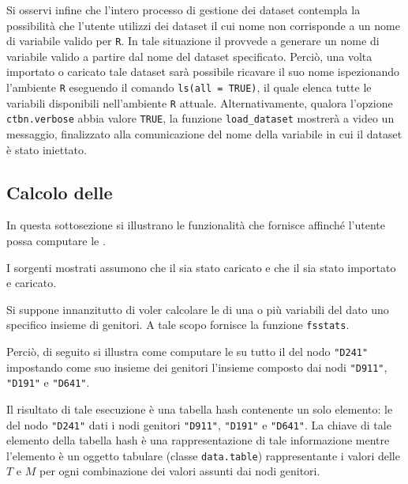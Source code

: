 Si osservi infine che l'intero processo di gestione dei dataset contempla la possibilità che l'utente utilizzi dei dataset il cui nome non corrisponde a un nome di variabile valido per \lstinline$R$. In tale situazione il \pacchettor{} provvede a generare un nome di variabile valido a partire dal nome del dataset specificato. Perciò, una volta importato o caricato tale dataset sarà possibile ricavare il suo nome ispezionando l'ambiente \lstinline$R$ eseguendo il comando \lstinline[language=rstats]{ls(all = TRUE)}, il quale elenca tutte le variabili disponibili nell'ambiente \lstinline$R$ attuale. Alternativamente, qualora l'opzione \lstinline$ctbn.verbose$ abbia valore \lstinline[language=rstats]{TRUE}, la funzione \lstinline[language=rstats]{load_dataset} mostrerà a video un messaggio, finalizzato alla comunicazione del nome della variabile in cui il dataset è stato iniettato.

\vspace*{8pt}

\subsection{Calcolo delle \stats{}}
In questa sottosezione si illustrano le funzionalità che \rctbn{} fornisce affinché l'utente possa computare le \emph{\stats{}}.

I sorgenti mostrati assumono che il \pacchettor{} sia stato caricato e che il  sia stato importato e caricato.

Si suppone innanzitutto di voler calcolare le \emph{\stats{}} di una o più variabili del  dato uno specifico insieme di genitori. A tale scopo \rctbn{} fornisce la funzione \lstinline[language=rstats]{fsstats}.

Perciò, di seguito si illustra come computare le \emph{\stats{}} su tutto il  del nodo \lstinline[language=rstats]{"D241"} impostando come suo insieme dei genitori l'insieme composto dai nodi \lstinline[language=rstats]{"D911"}, \lstinline[language=rstats]{"D191"} e \lstinline[language=rstats]{"D641"}.

\vspace*{8pt}
Il risultato di tale esecuzione è una tabella hash contenente un solo elemento: le \emph{\stats{}} del nodo \lstinline[language=rstats]{"D241"} dati i nodi genitori \lstinline[language=rstats]{"D911"}, \lstinline[language=rstats]{"D191"} e \lstinline[language=rstats]{"D641"}. La chiave di tale elemento della tabella hash è una rappresentazione di tale informazione mentre l'elemento è un oggetto tabulare (classe \lstinline$data.table$) rappresentante i valori delle \emph{\stats{}} $T$ e $M$ per ogni combinazione dei valori assunti dai nodi genitori.

